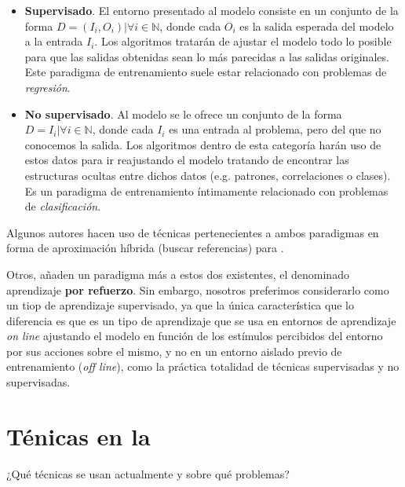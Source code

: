 \begin{itemize}
	\item \textbf{Supervisado}. El entorno presentado al modelo consiste en un conjunto de la forma $D = {(I_i, O_i) | \forall i \in \mathbb{N}}$, donde cada $O_i$ es la salida esperada del modelo a la entrada $I_i$. Los algoritmos tratarán de ajustar el modelo todo lo posible para que las salidas obtenidas sean lo más parecidas a las salidas originales. Este paradigma de entrenamiento suele estar relacionado con problemas de \textit{regresión}.
	\item \textbf{No supervisado}. Al modelo se le ofrece un conjunto de la forma $D = {I_i | \forall i \in \mathbb{N}}$, donde cada $I_i$ es una entrada al problema, pero del que no conocemos la salida. Los algoritmos dentro de esta categoría harán uso de estos datos para ir reajustando el modelo tratando de encontrar las estructuras ocultas entre dichos datos (e.g. patrones, correlaciones o clases). Es un paradigma de entrenamiento íntimamente relacionado con problemas de \textit{clasificación}.
\end{itemize}

Algunos autores hacen uso de técnicas pertenecientes a ambos paradigmas en forma de aproximación híbrida (\TODO buscar referencias) para .

Otros, añaden un paradigma más a estos dos existentes, el denominado aprendizaje \textbf{por refuerzo}. Sin embargo, nosotros preferimos considerarlo como un tiop de aprendizaje supervisado, ya que la única característica que lo diferencia es que es un tipo de aprendizaje que se usa en entornos de aprendizaje \textit{on line} ajustando el modelo en función de los estímulos percibidos del entorno por sus acciones sobre el mismo, y no en un entorno aislado previo de entrenamiento (\textit{off line}), como la práctica totalidad de técnicas supervisadas y no supervisadas.

\section{Ténicas en la }

¿Qué técnicas se usan actualmente y sobre qué problemas?

\section{}

